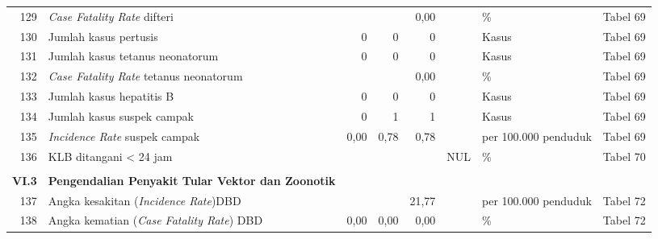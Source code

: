 \begin{small}
\begin{longtable}{rY{12em}rrrrY{5em}Y{5em}}
	129 & \emph{Case Fatality Rate} difteri                                           &        &        &               0,00 &          & \%                             & Tabel 69 \\
	130 & Jumlah kasus pertusis                                                       &      0 &      0 &                  0 &          & Kasus                          & Tabel 69 \\
	131 & Jumlah kasus tetanus neonatorum                                             &      0 &      0 &                  0 &          & Kasus                          & Tabel 69 \\
	132 & \emph{Case Fatality Rate} tetanus neonatorum                                &        &        &               0,00 &          & \%                             & Tabel 69 \\
	133 & Jumlah kasus hepatitis B                                                    &      0 &      0 &                  0 &          & Kasus                          & Tabel 69 \\
	134 & Jumlah kasus suspek campak                                                  &      0 &      1 &                  1 &          & Kasus                          & Tabel 69 \\
	135 & \emph{Incidence Rate} suspek campak                                         &   0,00 &   0,78 &               0,78 &          & per 100.000 penduduk           & Tabel 69 \\
	136 & KLB ditangani < 24 jam                                                      &        &        &                    &      NUL & \%                             & Tabel 70 \\
	&                                                                                 &        &        &                    &          &                                &          \\
	\textbf{VI.3} & \textbf{Pengendalian Penyakit Tular Vektor dan Zoonotik}          &        &        &                    &          &                                &          \\
	137 & Angka kesakitan (\emph{Incidence Rate})DBD                                  &        &        &              21,77 &          & per 100.000 penduduk           & Tabel 72 \\
	138 & Angka kematian (\emph{Case Fatality Rate}) DBD                              &   0,00 &   0,00 &               0,00 &          & \%                             & Tabel 72 \\

\end{longtable}
\end{small}
